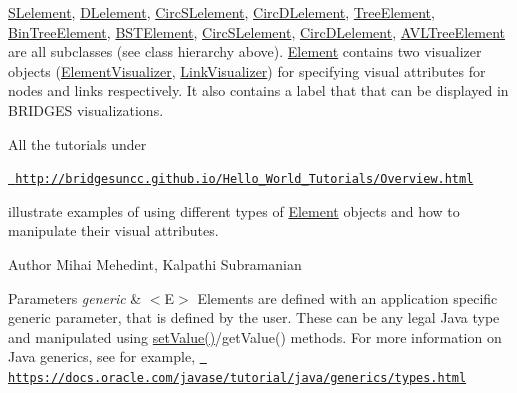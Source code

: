 \mbox{\hyperlink{classbridges_1_1base_1_1_s_lelement}{S\+Lelement}}, \mbox{\hyperlink{classbridges_1_1base_1_1_d_lelement}{D\+Lelement}}, \mbox{\hyperlink{classbridges_1_1base_1_1_circ_s_lelement}{Circ\+S\+Lelement}}, \mbox{\hyperlink{classbridges_1_1base_1_1_circ_d_lelement}{Circ\+D\+Lelement}}, \mbox{\hyperlink{classbridges_1_1base_1_1_tree_element}{Tree\+Element}}, \mbox{\hyperlink{classbridges_1_1base_1_1_bin_tree_element}{Bin\+Tree\+Element}}, \mbox{\hyperlink{classbridges_1_1base_1_1_b_s_t_element}{B\+S\+T\+Element}}, \mbox{\hyperlink{classbridges_1_1base_1_1_circ_s_lelement}{Circ\+S\+Lelement}}, \mbox{\hyperlink{classbridges_1_1base_1_1_circ_d_lelement}{Circ\+D\+Lelement}}, \mbox{\hyperlink{classbridges_1_1base_1_1_a_v_l_tree_element}{A\+V\+L\+Tree\+Element}} are all subclasses (see class hierarchy above). \mbox{\hyperlink{classbridges_1_1base_1_1_element}{Element}} contains two visualizer objects (\mbox{\hyperlink{classbridges_1_1base_1_1_element_visualizer}{Element\+Visualizer}}, \mbox{\hyperlink{classbridges_1_1base_1_1_link_visualizer}{Link\+Visualizer}}) for specifying visual attributes for nodes and links respectively. It also contains a label that that can be displayed in B\+R\+I\+D\+G\+ES visualizations.

All the tutorials under

\href{http://bridgesuncc.github.io/Hello_World_Tutorials/Overview.html}{\texttt{ http\+://bridgesuncc.\+github.\+io/\+Hello\+\_\+\+World\+\_\+\+Tutorials/\+Overview.\+html}}

illustrate examples of using different types of \mbox{\hyperlink{classbridges_1_1base_1_1_element}{Element}} objects and how to manipulate their visual attributes.

\begin{DoxyAuthor}{Author}
Mihai Mehedint, Kalpathi Subramanian
\end{DoxyAuthor}

\begin{DoxyParams}{Parameters}
{\em generic} & $<$\+E$>$ Elements are defined with an application specific generic parameter, that is defined by the user. These can be any legal Java type and manipulated using \mbox{\hyperlink{classbridges_1_1base_1_1_element_ab3cf1241da0bc4c59cea9d6f0fd7aaf4}{set\+Value()}}/get\+Value() methods. For more information on Java generics, see for example, \href{https://docs.oracle.com/javase/tutorial/java/generics/types.html}{\texttt{ https\+://docs.\+oracle.\+com/javase/tutorial/java/generics/types.\+html}} \\
\hline
\end{DoxyParams}


